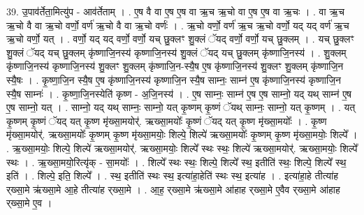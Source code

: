 \documentclass[17pt]{extarticle}
\begin{document}
39. उ॒पाव॑र्तेता॒मित्यु॑प - आव॑र्तेताम् । . ए॒ष वै वा ए॒ष ए॒ष वा ऋ॒च ऋ॒चो वा ए॒ष ए॒ष वा ऋ॒चः । . वा ऋ॒च ऋ॒चो वै वा ऋ॒चो वर्णो॒ वर्ण॑ ऋ॒चो वै वा ऋ॒चो वर्णः॑ । . ऋ॒चो वर्णो॒ वर्ण॑ ऋ॒च ऋ॒चो वर्णो॒ यद् यद् वर्ण॑ ऋ॒च ऋ॒चो वर्णो॒ यत् । . वर्णो॒ यद् यद् वर्णो॒ वर्णो॒ यच् छु॒क्लꣳ शु॒क्लं ॅयद् वर्णो॒ वर्णो॒ यच् छु॒क्लम् । . यच् छु॒क्लꣳ शु॒क्लं ॅयद् यच् छु॒क्लम् कृ॑ष्णाजि॒नस्य॑ कृष्णाजि॒नस्य॑ शु॒क्लं ॅयद् यच् छु॒क्लम् कृ॑ष्णाजि॒नस्य॑ । . शु॒क्लम् कृ॑ष्णाजि॒नस्य॑ कृष्णाजि॒नस्य॑ शु॒क्लꣳ शु॒क्लम् कृ॑ष्णाजि॒न-स्यै॒ष ए॒ष कृ॑ष्णाजि॒नस्य॑ शु॒क्लꣳ शु॒क्लम् कृ॑ष्णाजि॒न स्यै॒षः । . कृ॒ष्णा॒जि॒न स्यै॒ष ए॒ष कृ॑ष्णाजि॒नस्य॑ कृष्णाजि॒न स्यै॒ष साम्नः॒ साम्न॑ ए॒ष कृ॑ष्णाजि॒नस्य॑ कृष्णाजि॒न स्यै॒ष साम्नः॑ । . कृ॒ष्णा॒जि॒नस्येति॑ कृष्ण - अ॒जि॒नस्य॑ । . ए॒ष साम्नः॒ साम्न॑ ए॒ष ए॒ष साम्नो॒ यद् यथ् साम्न॑ ए॒ष ए॒ष साम्नो॒ यत् । . साम्नो॒ यद् यथ् साम्नः॒ साम्नो॒ यत् कृ॒ष्णम् कृ॒ष्णं ॅयथ् साम्नः॒ साम्नो॒ यत् कृ॒ष्णम् । . यत् कृ॒ष्णम् कृ॒ष्णं ॅयद् यत् कृ॒ष्ण मृ॑ख्सा॒मयोर्॑. ऋख्सा॒मयोः᳚ कृ॒ष्णं ॅयद् यत् कृ॒ष्ण मृ॑ख्सा॒मयोः᳚ । . कृ॒ष्ण मृ॑ख्सा॒मयोर्॑. ऋख्सा॒मयोः᳚ कृ॒ष्णम् कृ॒ष्ण मृ॑ख्सा॒मयोः॒ शिल्पे॒ शिल्पे॑ ऋख्सा॒मयोः᳚ कृ॒ष्णम् कृ॒ष्ण मृ॑ख्सा॒मयोः॒ शिल्पे᳚ । . ऋ॒ख्सा॒मयोः॒ शिल्पे॒ शिल्पे॑ ऋख्सा॒मयोर्॑. ऋख्सा॒मयोः॒ शिल्पे᳚ स्थः स्थः॒ शिल्पे॑ ऋख्सा॒मयोर्॑. ऋख्सा॒मयोः॒ शिल्पे᳚ स्थः । . ऋ॒ख्सा॒मयो॒रित्यृ॑क् - सा॒मयोः᳚ । . शिल्पे᳚ स्थः स्थः॒ शिल्पे॒ शिल्पे᳚ स्थ॒ इतीति॑ स्थः॒ शिल्पे॒ शिल्पे᳚ स्थ॒ इति॑ । . शिल्पे॒ इति॒ शिल्पे᳚ । . स्थ॒ इतीति॑ स्थः स्थ॒ इत्या॑हा॒हेति॑ स्थः स्थ॒ इत्या॑ह । . इत्या॑हा॒हे तीत्या॑ह र्‌ख्सा॒मे ऋ॑ख्सा॒मे आ॒हे तीत्या॑ह र्‌ख्सा॒मे । . आ॒ह॒ र्‌ख्सा॒मे ऋ॑ख्सा॒मे आ॑हाह र्‌ख्सा॒मे ए॒वैव र्‌‍ख्सा॒मे आ॑हाह र्‌ख्सा॒मे ए॒व । \newline
\end{document}
